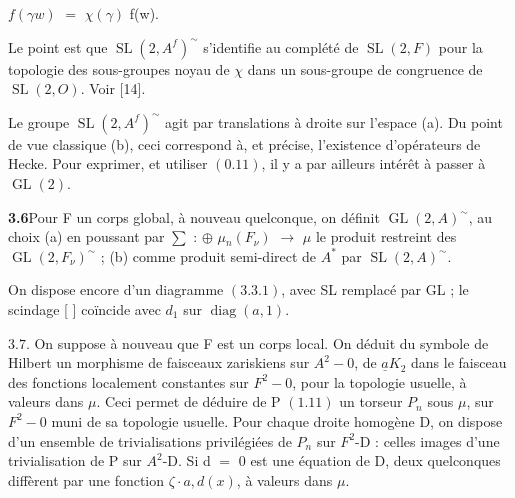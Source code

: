 \documentclass[10pt,a4paper]{article}
\begin{document}
\clearpage
{}
\label{d035-physical-017}
\par\smallskip\begin{center}\begin{minipage}{0.96\textwidth}\centering
$f(\gamma{}w)$ $=$ $\chi{}(\gamma{})$ f(w).
\end{minipage}\end{center}\smallskip
\par Le point est que $\operatorname{SL}(2,A^f)^\sim$ s'identifie au complété de $\operatorname{SL}(2,F)$ pour la topologie des sous-groupes noyau de $\chi{}$ dans un sous-groupe de congruence de $\operatorname{SL}(2,O)$. Voir [14].\par
\par Le groupe $\operatorname{SL}(2,A^f)^\sim$ agit par translations à droite sur l'espace (a). Du point de vue classique (b), ceci correspond à, et précise, l'existence d'opérateurs de Hecke. Pour exprimer, et utiliser $(0.11)$, il y a par ailleurs intérêt à passer à $\operatorname{GL}(2)$.\par
\par\noindent\textbf{3.6}\quad Pour F un corps global, à nouveau quelconque, on définit $\operatorname{GL}(2,A)^\sim$, au choix (a) en poussant par $\sum{}$ : $\oplus{}$ $\mu{}_n(F_\nu{})$ $\to{}$ $\mu{}$ le produit restreint des $\operatorname{GL}(2,F_\nu{})^\sim$ ; (b) comme produit semi-direct de $A^*$ par $\operatorname{SL}(2,A)^\sim$.\par
\par On dispose encore d'un diagramme $(3.3.1)$, avec SL remplacé par GL ; le scindage [ ] coïncide avec $d_1$ sur $\operatorname{diag}(a,1)$.\par
\par $3.7$. On suppose à nouveau que F est un corps local. On déduit du symbole de Hilbert un morphisme de faisceaux zariskiens sur $A^2-{0}$, de $\underline{a}K_2$ dans le faisceau des fonctions localement constantes sur $F^2-{0}$, pour la topologie usuelle, à valeurs dans $\mu{}$. Ceci permet de déduire de P $(1.11)$ un torseur $P_n$ sous $\mu{}$, sur $F^2-{0}$ muni de sa topologie usuelle. Pour chaque droite homogène D, on dispose d'un ensemble de trivialisations privilégiées de $P_n$ sur $F^2$-D : celles images d'une trivialisation de P sur $A^2$-D. Si d $=$ 0 est une équation de D, deux quelconques diffèrent par une fonction $\zeta{}\cdot{}{a,d(x)}$, à valeurs dans $\mu{}$.\par
\end{document}
